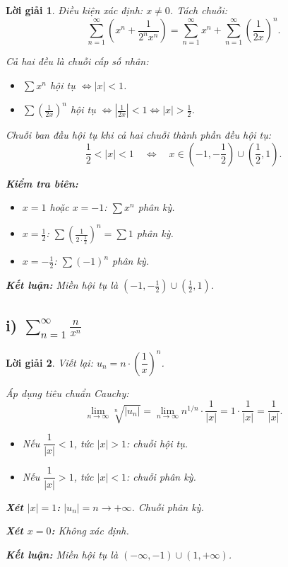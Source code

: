 \documentclass[12pt,a4paper]{article}
\newtheorem*{solution}{Lời giải}
\begin{document}
\begin{solution}
Điều kiện xác định: $x \neq 0$. Tách chuỗi:
\[
\sum_{n=1}^{\infty}\left(x^{n}+\frac{1}{2^{n}x^{n}}\right) = \sum_{n=1}^{\infty} x^n + \sum_{n=1}^{\infty}\left(\frac{1}{2x}\right)^n.
\]

Cả hai đều là chuỗi cấp số nhân:
\begin{itemize}
    \item $\sum x^n$ hội tụ $\Leftrightarrow |x| < 1$.
    \item $\sum \left(\frac{1}{2x}\right)^n$ hội tụ $\Leftrightarrow \left|\frac{1}{2x}\right| < 1 \Leftrightarrow |x| > \frac{1}{2}$.
\end{itemize}

Chuỗi ban đầu hội tụ khi cả hai chuỗi thành phần đều hội tụ:
\[
\frac{1}{2} < |x| < 1 \quad\Leftrightarrow\quad x \in \left(-1, -\frac{1}{2}\right) \cup \left(\frac{1}{2}, 1\right).
\]

\textbf{Kiểm tra biên:}
\begin{itemize}
    \item $x = 1$ hoặc $x = -1$: $\sum x^n$ phân kỳ.
    \item $x = \frac{1}{2}$: $\sum \left(\frac{1}{2\cdot\frac{1}{2}}\right)^n = \sum 1$ phân kỳ.
    \item $x = -\frac{1}{2}$: $\sum (-1)^n$ phân kỳ.
\end{itemize}

\textbf{Kết luận:} Miền hội tụ là $\boxed{\left(-1,-\frac{1}{2}\right) \cup \left(\frac{1}{2}, 1\right)}$.
\end{solution}

\subsection*{i) $\displaystyle\sum_{n=1}^{\infty}\frac{n}{x^{n}}$}

\begin{solution}
Viết lại: $u_n = n \cdot \left(\dfrac{1}{x}\right)^n$.

Áp dụng tiêu chuẩn Cauchy:
\[
\lim_{n\to\infty} \sqrt[n]{|u_n|} = \lim_{n\to\infty} n^{1/n} \cdot \frac{1}{|x|} = 1 \cdot \frac{1}{|x|} = \frac{1}{|x|}.
\]

\begin{itemize}
    \item Nếu $\dfrac{1}{|x|} < 1$, tức $|x| > 1$: chuỗi hội tụ.
    \item Nếu $\dfrac{1}{|x|} > 1$, tức $|x| < 1$: chuỗi phân kỳ.
\end{itemize}

\textbf{Xét $|x| = 1$:} $|u_n| = n \to +\infty$. Chuỗi phân kỳ.

\textbf{Xét $x = 0$:} Không xác định.

\textbf{Kết luận:} Miền hội tụ là $\boxed{(-\infty, -1) \cup (1, +\infty)}$.
\end{solution}
\end{document}
